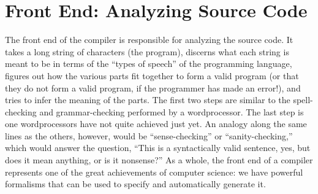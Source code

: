 \section{Front End: Analyzing Source Code}
The front end of the compiler is responsible for analyzing the source code. It takes a long string of characters (the program), discerns what each string is meant to be in terms of the ``types of speech'' of the programming language, figures out how the various parts fit together to form a valid program (or that they do not form a valid program, if the programmer has made an error!), and tries to infer the meaning of the parts. The first two steps are similar to the spell-checking and grammar-checking performed by a wordprocessor. The last step is one wordprocessors have not quite achieved just yet. An analogy along the same lines as the others, however, would be ``sense-checking'' or ``sanity-checking,'' which would answer the question, ``This is a syntactically valid sentence, yes, but does it mean anything, or is it nonsense?'' As a whole, the front end of a compiler represents one of the great achievements of computer science: we have powerful formalisms that can be used to specify and automatically generate it.




